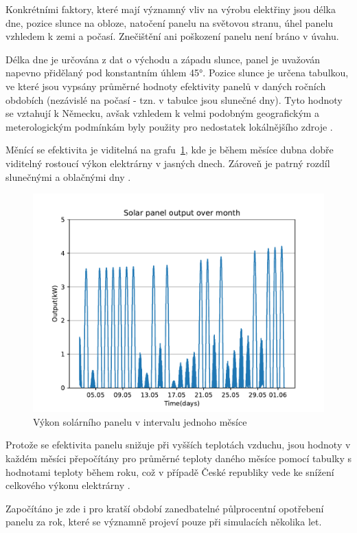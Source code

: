 \documentclass[12pt,a4paper]{article}
\begin{document}
Konkrétními faktory, které mají významný vliv na výrobu elektřiny jsou délka dne, pozice slunce na obloze, natočení panelu na světovou stranu, úhel panelu vzhledem k zemi a počasí. Znečištění ani poškození panelu není bráno v úvahu.

Délka dne je určována z dat o východu a západu slunce, panel je uvažován napevno přidělaný pod konstantním úhlem 45°.
Pozice slunce je určena tabulkou, ve které jsou vypsány průměrné hodnoty efektivity panelů v daných ročních obdobích (nezávislé na počasí - tzn. v tabulce jsou slunečné dny). Tyto hodnoty se vztahují k Německu, avšak vzhledem k velmi podobným geografickým a meterologickým podmínkám byly použity pro nedostatek lokálnějšího zdroje
\cite{German-solar-hourly-2014}.

 Měnící se efektivita je viditelná na grafu~\ref{fig:solar_month}, kde je během měsíce dubna dobře viditelný rostoucí výkon elektrárny v jasných dnech. Zároveň je patrný rozdíl slunečnými a oblačnými dny \cite{PF-Bach-2022}.

\begin{figure}[H]
\begin{center}
\includegraphics[width=0.8\linewidth]{img/solar_month.pdf}
\caption{Výkon solárního panelu v intervalu jednoho měsíce}
\end{center}
\label{fig:solar_month}
\end{figure}

Protože se efektivita panelu snižuje při vyšších teplotách vzduchu, jsou hodnoty v každém měsíci přepočítány pro průměrné teploty daného měsíce pomocí tabulky s hodnotami teploty během roku, což v případě České republiky vede ke snížení celkového výkonu elektrárny \cite{Cotmas-2018}.

Započítáno je zde i pro kratší období zanedbatelné půlprocentní opotřebení panelu za rok, které se významně projeví pouze při simulacích několika let.
\end{document}

